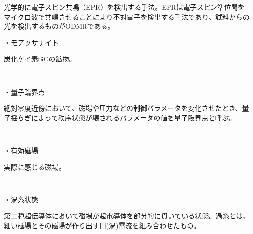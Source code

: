 \documentclass[dvipdfmx]{jsarticle}
\begin{document}
光学的に電子スピン共鳴（EPR）を検出する手法。EPRは電子スピン準位間をマイクロ波で共鳴させることにより不対電子を検出する手法であり、試料からの光を検出するものがODMRである。

\newpage


・モアッサナイト

炭化ケイ素SiCの鉱物。

　　

・量子臨界点

絶対零度近傍において、磁場や圧力などの制御パラメータを変化させたとき、量子揺らぎによって秩序状態が壊されるパラメータの値を量子臨界点と呼ぶ。

　　

・有効磁場

実際に感じる磁場。

　　

・渦糸状態

第二種超伝導体において磁場が超電導体を部分的に貫いている状態。渦糸とは、細い磁場とその磁場が作り出す円(渦)電流を組み合わせたもの。
\end{document}

